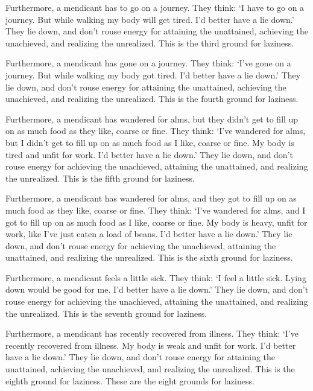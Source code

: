 \documentclass[12pt,openany]{book}%
\begin{document}
Furthermore, a mendicant has to go on a journey. They think: ‘I have to go on a journey. But while walking my body will get tired. I’d better have a lie down.’ They lie down, and don’t rouse energy for attaining the unattained, achieving the unachieved, and realizing the unrealized. This is the third ground for laziness. 

Furthermore, a mendicant has gone on a journey. They think: ‘I’ve gone on a journey. But while walking my body got tired. I’d better have a lie down.’ They lie down, and don’t rouse energy for attaining the unattained, achieving the unachieved, and realizing the unrealized. This is the fourth ground for laziness. 

Furthermore, a mendicant has wandered for alms, but they didn’t get to fill up on as much food as they like, coarse or fine. They think: ‘I’ve wandered for alms, but I didn’t get to fill up on as much food as I like, coarse or fine. My body is tired and unfit for work. I’d better have a lie down.’ They lie down, and don’t rouse energy for achieving the unachieved, attaining the unattained, and realizing the unrealized. This is the fifth ground for laziness. 

Furthermore, a mendicant has wandered for alms, and they got to fill up on as much food as they like, coarse or fine. They think: ‘I’ve wandered for alms, and I got to fill up on as much food as I like, coarse or fine. My body is heavy, unfit for work, like I’ve just eaten a load of beans. I’d better have a lie down.’ They lie down, and don’t rouse energy for achieving the unachieved, attaining the unattained, and realizing the unrealized. This is the sixth ground for laziness. 

Furthermore, a mendicant feels a little sick. They think: ‘I feel a little sick. Lying down would be good for me. I’d better have a lie down.’ They lie down, and don’t rouse energy for achieving the unachieved, attaining the unattained, and realizing the unrealized. This is the seventh ground for laziness. 

Furthermore, a mendicant has recently recovered from illness. They think: ‘I’ve recently recovered from illness. My body is weak and unfit for work. I’d better have a lie down.’ They lie down, and don’t rouse energy for attaining the unattained, achieving the unachieved, and realizing the unrealized. This is the eighth ground for laziness. These are the eight grounds for laziness. 
\end{document}
